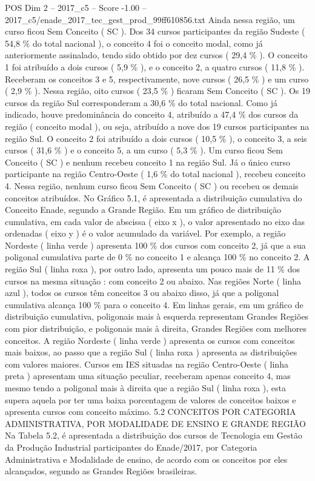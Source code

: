 \begin{textsample}{POS Dim 2 – 2017\_c5 – Score -1.00 – 2017\_c5/enade\_2017\_tec\_gest\_prod\_99ff610856.txt}
Ainda nessa região, um curso ficou Sem Conceito ( SC ).
Dos 34 cursos participantes da região Sudeste ( 54,8 \% do total nacional ), o conceito 4 foi o conceito modal, como já anteriormente assinalado, tendo sido obtido por dez cursos ( 29,4 \% ).
O conceito 1 foi atribuído a dois cursos ( 5,9 \% ), e o conceito 2, a quatro cursos ( 11,8 \% ).
Receberam os conceitos 3 e 5, respectivamente, nove cursos ( 26,5 \% ) e um curso ( 2,9 \% ).
Nessa região, oito cursos ( 23,5 \% ) ficaram Sem Conceito ( SC ).
Os 19 cursos da região Sul corresponderam a 30,6 \% do total nacional.
Como já indicado, houve predominância do conceito 4, atribuído a 47,4 \% dos cursos da região ( conceito modal ), ou seja, atribuído a nove dos 19 cursos participantes na região Sul.
O conceito 2 foi atribuído a dois cursos ( 10,5 \% ), o conceito 3, a seis cursos ( 31,6 \% ) e o conceito 5, a um curso ( 5,3 \% ).
Um curso ficou Sem Conceito ( SC ) e nenhum recebeu conceito 1 na região Sul.
Já o único curso participante na região Centro-Oeste ( 1,6 \% do total nacional ), recebeu conceito 4.
Nessa região, nenhum curso ficou Sem Conceito ( SC ) ou recebeu os demais conceitos atribuídos.
No Gráfico 5.1, é apresentada a distribuição cumulativa do Conceito Enade, segundo a Grande Região.
Em um gráfico de distribuição cumulativa, em cada valor de abscissa ( eixo x ), o valor apresentado no eixo das ordenadas ( eixo y ) é o valor acumulado da variável.
Por exemplo, a região Nordeste ( linha verde ) apresenta 100 \% dos cursos com conceito 2, já que a sua poligonal cumulativa parte de 0 \% no conceito 1 e alcança 100 \% no conceito 2.
A região Sul ( linha roxa ), por outro lado, apresenta um pouco mais de 11 \% dos cursos na mesma situação : com conceito 2 ou abaixo.
Nas regiões Norte ( linha azul ), todos os cursos têm conceitos 3 ou abaixo disso, já que a poligonal cumulativa alcança 100 \% para o conceito 4.
Em linhas gerais, em um gráfico de distribuição cumulativa, poligonais mais à esquerda representam Grandes Regiões com pior distribuição, e poligonais mais à direita, Grandes Regiões com melhores conceitos.
A região Nordeste ( linha verde ) apresenta os cursos com conceitos mais baixos, ao passo que a região Sul ( linha roxa ) apresenta as distribuições com valores maiores.
Cursos em IES situadas na região Centro-Oeste ( linha preta ) apresentam uma situação peculiar, receberam apenas conceito 4, mas mesmo tendo a poligonal mais à direita que a região Sul ( linha roxa ), esta supera aquela por ter uma baixa porcentagem de valores de conceitos baixos e apresenta cursos com conceito máximo. 5.2 CONCEITOS POR CATEGORIA ADMINISTRATIVA, POR MODALIDADE DE ENSINO E GRANDE REGIÃO Na Tabela 5.2, é apresentada a distribuição dos cursos de Tecnologia em Gestão da Produção Industrial participantes do Enade/2017, por Categoria Administrativa e Modalidade de ensino, de acordo com os conceitos por eles alcançados, segundo as Grandes Regiões brasileiras.

\end{textsample}
